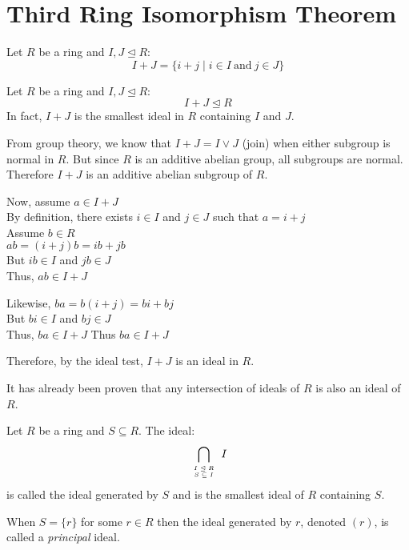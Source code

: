 \documentclass[letterpaper,12pt,fleqn]{article}
\newcommand{\ide}{\trianglelefteq}
\begin{document}
\section*{Third Ring Isomorphism Theorem}

\begin{definition}
  Let $R$ be a ring and $I,J\ide R$:
  \[I+J=\{i+j\mid i\in I\ \mbox{and}\ j\in J\}\]
\end{definition}

\begin{theorem}
  Let $R$ be a ring and $I,J\ide R$:
  \[I+J\ide R\]
  In fact, $I+J$ is the smallest ideal in $R$ containing $I$ and $J$.
\end{theorem}

\begin{theproof}
  From group theory, we know that $I+J=I\vee J$ (join) when either subgroup is
  normal in $R$. But since $R$ is an additive abelian group, all subgroups are
  normal. Therefore $I+J$ is an additive abelian subgroup of $R$.

  Now, assume $a\in I+J$ \\
  By definition, there exists $i\in I$ and $j\in J$ such that $a=i+j$ \\
  Assume $b\in R$ \\
  $ab=(i+j)b=ib+jb$ \\
  But $ib\in I$ and $jb\in J$ \\
  Thus, $ab\in I+J$

  Likewise, $ba=b(i+j)=bi+bj$ \\
  But $bi\in I$ and $bj\in J$ \\
  Thus, $ba\in I+J$
  Thus $ba\in I+J$

  Therefore, by the ideal test, $I+J$ is an ideal in $R$.
\end{theproof}

It has already been proven that any intersection of ideals of $R$ is also an
ideal of $R$.

\begin{definition}
  Let $R$ be a ring and $S\subseteq R$. The ideal:
  \[\bigcap_{\tiny\begin{array}{c}I\ide R \\ S\subseteq I\end{array}}I\]
  is called the ideal generated by $S$ and is the smallest ideal of $R$
  containing $S$.

  When $S=\{r\}$ for some $r\in R$ then the ideal generated by $r$, denoted
  $(r)$, is called a \emph{principal} ideal.
\end{definition}
\end{document}

